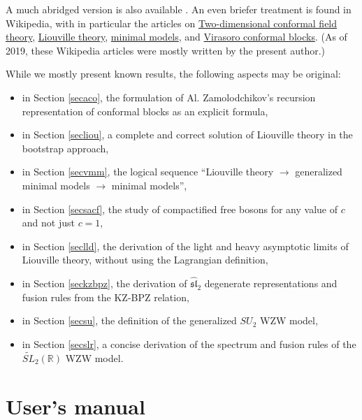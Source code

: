 \documentclass[12pt, a4paper, notitlepage, twoside]{report}
\numberwithin{equation}{section}
\theoremstyle{break}
\begin{document}
A much abridged version is also available \cite{rib16}. An even briefer treatment is found in Wikipedia, with in particular the articles on \href{https://en.wikipedia.org/wiki/Two-dimensional_conformal_field_theory}{Two-dimensional conformal field theory}, \href{https://en.wikipedia.org/wiki/Liouville_field_theory}{Liouville theory},
\href{https://en.wikipedia.org/wiki/Minimal_models}{minimal models}, and \href{https://en.wikipedia.org/wiki/Virasoro_conformal_block}{Virasoro conformal blocks}.
(As of 2019, these Wikipedia articles were mostly written by the present author.)

While we mostly present known results, the following aspects may be original:
\begin{itemize}
\item in Section \ref{secaco}, the formulation of Al. Zamolodchikov's recursion representation of conformal blocks as an explicit formula,
\item in Section \ref{secliou}, a complete and correct solution of Liouville theory in the bootstrap approach, 
\item in Section \ref{secvmm}, the logical sequence ``Liouville theory $\rightarrow$ generalized minimal models $\rightarrow$ minimal models'',
\item in Section \ref{secsacf}, the study of compactified free bosons for any value of $c$ and not just $c=1$,
\item in Section \ref{seclld}, the derivation of the light and heavy asymptotic limits of Liouville theory, without using the Lagrangian definition,
\item in Section \ref{seckzbpz}, the derivation of $\widehat{\mathfrak{sl}}_2$ degenerate representations and fusion rules from the KZ-BPZ relation,
\item in Section \ref{secsu}, the definition of the generalized $SU_2$ WZW model,
\item in Section \ref{secslr}, a concise derivation of the spectrum and fusion rules of the $\widetilde{SL}_2(\mathbb{R})$ WZW model.
\end{itemize}


\section{User's manual}
\end{document}
